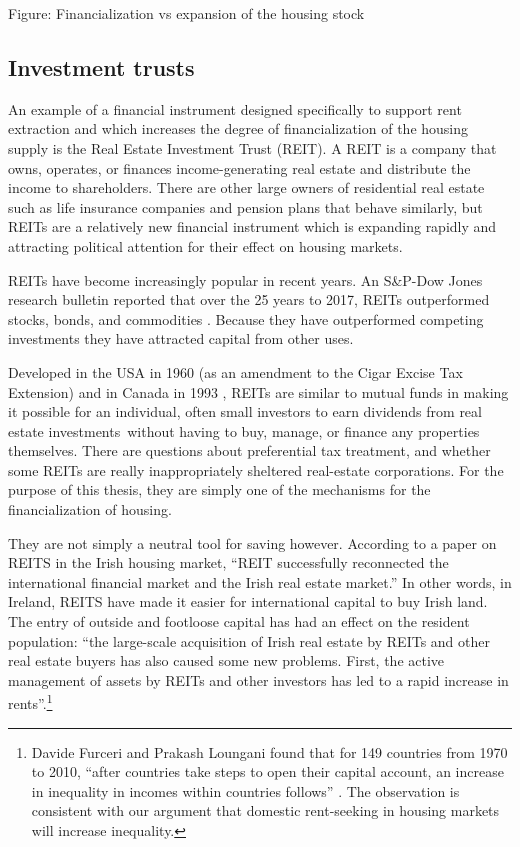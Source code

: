 Figure: Financialization vs expansion of the housing stock 

\subsection{Investment trusts}

An example of a financial instrument designed specifically to support rent extraction and which  increases the degree of financialization of the housing supply is the  Real Estate Investment Trust (REIT).  A REIT is a company that owns, operates, or finances income-generating real estate and distribute the income to shareholders. There are other large owners of residential real estate such as life insurance companies and pension plans that behave similarly, but REITs are a relatively new financial instrument which is  expanding rapidly and attracting political attention for their effect on housing markets.  %

REITs have become increasingly popular in recent years.  An S\&P-Dow Jones research bulletin reported that over the  25 years to 2017, REITs outperformed stocks, bonds, and commodities \cite{Dow-Jones-research-bulletin}. Because they have outperformed competing investments they have attracted  capital from other uses.

Developed in the USA  in 1960 (as an amendment to the Cigar Excise Tax Extension) and in Canada in 1993 \cite{REITsDevelopedDates}, REITs are similar to mutual funds in making it possible for an individual, often small investors to earn dividends from real estate investments without having to buy, manage, or finance any properties themselves. There are questions about preferential tax treatment, and whether some REITs are really inappropriately sheltered real-estate corporations.  For the purpose of this thesis, they are simply one of the mechanisms for the financialization of housing.

They are not simply a neutral tool for saving however. According to a paper \cite{wangAnalyzeImpactREITs2021} on REITS in the Irish housing market, ``REIT successfully reconnected the international financial market and the Irish real estate market.'' In other words, in Ireland, REITS have made it easier for international capital to buy Irish land. The entry of outside and footloose capital has had an effect on the resident population:  ``the large-scale acquisition of Irish real estate by REITs and other real estate buyers has also caused some new problems. First, the active management of assets by REITs and other investors has led to a rapid increase in rents''.\footnote{%
Davide Furceri and Prakash Loungani found that for 149 countries from 1970 to 2010, ``after countries take steps to open their capital account, an increase in inequality in incomes within countries follows'' \cite{furceriCapitalAccountLiberalization2015}. The observation is consistent with our argument  that domestic rent-seeking in housing markets will increase inequality.}   

